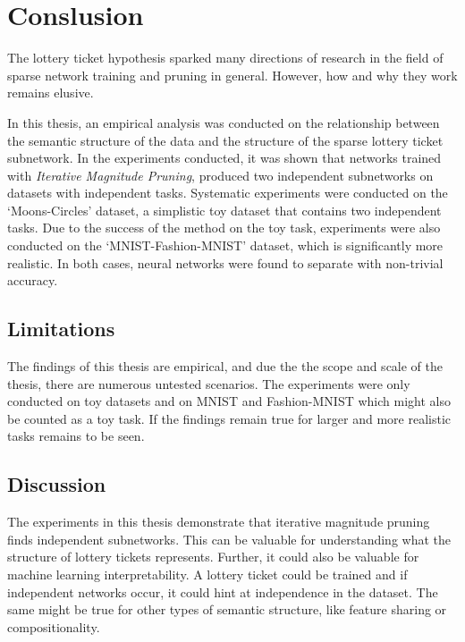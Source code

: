 \chapter{Conslusion}

The lottery ticket hypothesis sparked many directions of research in the field of sparse network training and pruning in general.
However, how and why they work remains elusive.

In this thesis, an empirical analysis was conducted on the relationship between the semantic structure of the data and the structure of the sparse lottery ticket subnetwork.
In the experiments conducted, it was shown that networks trained with \textit{Iterative Magnitude Pruning}, produced two independent subnetworks on datasets with independent tasks.
Systematic experiments were conducted on the `Moons-Circles' dataset, a simplistic toy dataset that contains two independent tasks.
Due to the success of the method on the toy task, experiments were also conducted on the `MNIST-Fashion-MNIST' dataset, which is significantly more realistic.
In both cases, neural networks were found to separate with non-trivial accuracy.

\section{Limitations}
The findings of this thesis are empirical, and due the the scope and scale of the thesis, there are numerous untested scenarios.
The experiments were only conducted on toy datasets and on MNIST and Fashion-MNIST which might also be counted as a toy task.
If the findings remain true for larger and more realistic tasks remains to be seen.

\section{Discussion}
The experiments in this thesis demonstrate that iterative magnitude pruning finds independent subnetworks.
This can be valuable for understanding what the structure of lottery tickets represents.
Further, it could also be valuable for machine learning interpretability.
A lottery ticket could be trained and if independent networks occur, it could hint at independence in the dataset.
The same might be true for other types of semantic structure, like feature sharing or compositionality.

